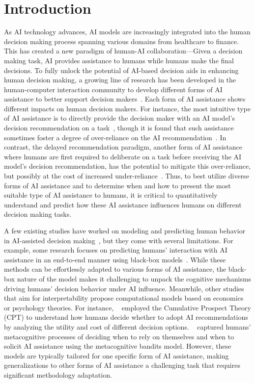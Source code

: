 \documentclass[letterpaper]{article} %
\begin{document}
\section{Introduction}
As AI technology advances, AI models are increasingly integrated into the human decision making process  spanning various domains from healthcare to finance. This has created a new paradigm of human-AI collaboration---Given a decision making task, AI provides assistance to humans while humans make the final decisions. To fully unlock the potential of AI-based decision aids in enhancing human decision making, a growing line of research has been developed in the human-computer interaction community to develop different forms of AI assistance to better support decision makers~\cite{Lai2023TowardsAS}. Each form of AI assistance shows different impacts on human decision makers.
For instance, the most intuitive type of AI assistance is to directly provide the decision maker with an AI model's decision recommendation on a task~\cite{passi2022overreliance,wang2023effects}, though it is found that such assistance sometimes foster a degree of over-reliance on the AI recommendation~\cite{Ma2023WhoSI}. In contrast, the delayed recommendation paradigm,  another form of AI assistance where humans are first required to deliberate on a task before receiving the AI model's decision recommendation, has the potential to mitigate this over-reliance, but possibly at the cost of increased under-reliance~\cite{Buccinca2021ToTO, Fogliato2022WhoGF}.
Thus, to best utilize diverse forms of AI assistance and to determine when and how to present the most suitable type of AI assistance to humans, it is critical to quantitatively understand and predict how these AI assistance influences humans on different decision making tasks.


A few existing studies have worked on modeling and predicting human behavior in AI-assisted decision making~\cite{kumar2021explaining,Bansal2021IsTM}, but they come with several limitations. For example, some research focuses on predicting humans' interaction with AI assistance in an end-to-end manner using black-box models~\cite{subrahmanian2017predicting}. While these methods can be effortlessly adapted to various forms of AI assistance,  the black-box nature of the model makes it challenging to unpack the cognitive mechanisms driving humans' decision behavior under AI influence.  Meanwhile, other studies that aim for interpretability propose computational models based on
economics or psychology theories. For instance, \citeauthor{wang2022will}~ employed the Cumulative Prospect Theory (CPT) to understand how humans decide whether to adopt AI recommendations by analyzing the utility and cost of different decision options. \citeauthor{kumar2021explaining}~
captured humans' metacognitive processes of deciding when to rely on themselves and when to solicit AI assistance using
the metacognitive bandits model.
However, these models
are typically tailored for one specific form of AI assistance, making generalizations to other forms of AI assistance a challenging task that requires significant methodology adaptation.
\end{document}
